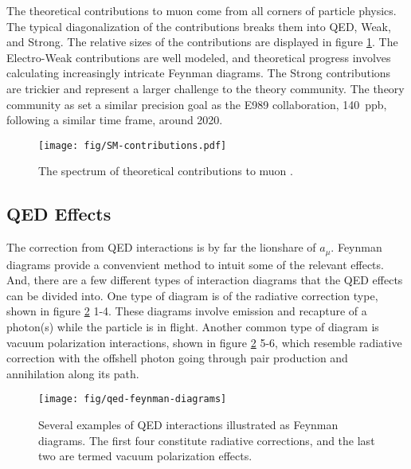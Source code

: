 The theoretical contributions to muon \gmtwo come from all corners of particle physics.  The typical diagonalization of the contributions breaks them into QED, Weak, and Strong. The relative sizes of the contributions are displayed in figure \ref{fig:sm-contributions}. The Electro-Weak contributions are well modeled, and theoretical progress involves calculating increasingly intricate Feynman diagrams.  The Strong contributions are trickier and represent a larger challenge to the theory community.  The theory community as set a similar precision goal as the E989 collaboration, \SI{140}{ppb}, following a similar time frame, around 2020.


\begin{figure}
\texttt{[image: fig/SM-contributions.pdf]}
\label{fig:sm-contributions}
\caption{The spectrum of theoretical contributions to muon \gmtwo.}
\end{figure}

\subsection{QED Effects} \label{sec:theory-qed}

The correction from QED interactions is by far the lionshare of $a_\mu$.  Feynman diagrams provide a convenvient method to intuit some of the relevant effects.  And, there are a few different types of interaction diagrams that the QED effects can be divided into.  One type of diagram is of the radiative correction type, shown in figure \ref{fig:qed-feynman-diagrams} 1-4.  These diagrams involve emission and recapture of a photon(s) while the particle is in flight.  Another common type of diagram is vacuum polarization interactions, shown in figure \ref{fig:qed-feynman-diagrams} 5-6, which resemble radiative correction with the offshell photon going through pair production and annihilation along its path.

\begin{figure}
\label{fig:qed-feynman-diagrams}
\texttt{[image: fig/qed-feynman-diagrams]}
\caption{Several examples of QED interactions illustrated as Feynman diagrams.  The first four constitute radiative corrections, and the last two are termed vacuum polarization effects. }
\end{figure}


